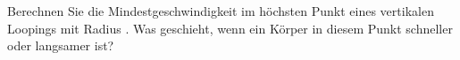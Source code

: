 Berechnen Sie die Mindestgeschwindigkeit im höchsten Punkt eines vertikalen Loopings mit Radius \rLoO. Was geschieht, wenn ein Körper in diesem Punkt schneller oder langsamer ist?
